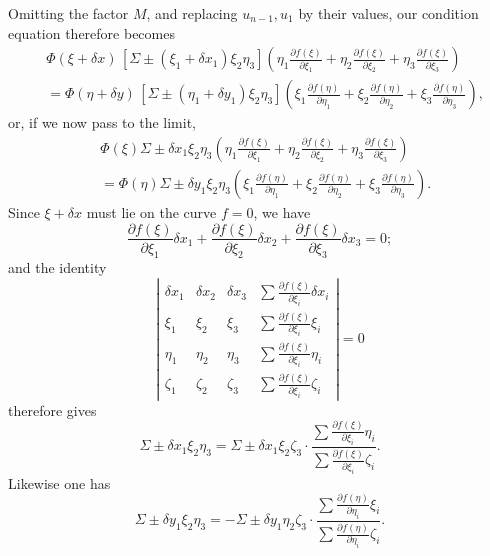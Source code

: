 \documentclass[10pt]{article}
\begin{document}
Omitting the factor \(M\), and replacing \(u_{n-1},u_1\) by their values, our condition equation therefore becomes
\[
\begin{aligned}
&\Phi(\xi+\delta x)\,[\Sigma\pm(\xi_1+\delta x_1)\xi_2\eta_3]
\left(\eta_1\frac{\partial f(\xi)}{\partial\xi_1}+\eta_2\frac{\partial f(\xi)}{\partial\xi_2}+\eta_3\frac{\partial f(\xi)}{\partial\xi_3}\right)\\
&=\Phi(\eta+\delta y)\,[\Sigma\pm(\eta_1+\delta y_1)\xi_2\eta_3]
\left(\xi_1\frac{\partial f(\eta)}{\partial\eta_1}+\xi_2\frac{\partial f(\eta)}{\partial\eta_2}+\xi_3\frac{\partial f(\eta)}{\partial\eta_3}\right),
\end{aligned}
\]
or, if we now pass to the limit,
\[
\begin{aligned}
&\Phi(\xi)\Sigma\pm\delta x_1\xi_2\eta_3
\left(\eta_1\frac{\partial f(\xi)}{\partial\xi_1}+\eta_2\frac{\partial f(\xi)}{\partial\xi_2}+\eta_3\frac{\partial f(\xi)}{\partial\xi_3}\right)\\
&=\Phi(\eta)\Sigma\pm\delta y_1\xi_2\eta_3
\left(\xi_1\frac{\partial f(\eta)}{\partial\eta_1}+\xi_2\frac{\partial f(\eta)}{\partial\eta_2}+\xi_3\frac{\partial f(\eta)}{\partial\eta_3}\right).
\end{aligned}
\]
Since \(\xi+\delta x\) must lie on the curve \(f=0\), we have
\[
\frac{\partial f(\xi)}{\partial\xi_1}\delta x_1
+\frac{\partial f(\xi)}{\partial\xi_2}\delta x_2
+\frac{\partial f(\xi)}{\partial\xi_3}\delta x_3=0;
\]
and the identity
\[
\left|
\begin{array}{cccc}
\delta x_1&\delta x_2&\delta x_3&\displaystyle\sum\frac{\partial f(\xi)}{\partial\xi_i}\delta x_i\\
\xi_1&\xi_2&\xi_3&\displaystyle\sum\frac{\partial f(\xi)}{\partial\xi_i}\xi_i\\
\eta_1&\eta_2&\eta_3&\displaystyle\sum\frac{\partial f(\xi)}{\partial\xi_i}\eta_i\\
\zeta_1&\zeta_2&\zeta_3&\displaystyle\sum\frac{\partial f(\xi)}{\partial\xi_i}\zeta_i
\end{array}
\right|=0
\]
therefore gives
\[
\Sigma\pm\delta x_1\xi_2\eta_3=
\Sigma\pm\delta x_1\xi_2\zeta_3\cdot
\frac{\displaystyle\sum\frac{\partial f(\xi)}{\partial\xi_i}\eta_i}
{\displaystyle\sum\frac{\partial f(\xi)}{\partial\xi_i}\zeta_i}.
\]
Likewise one has
\[
\Sigma\pm\delta y_1\xi_2\eta_3=
-\Sigma\pm\delta y_1\eta_2\zeta_3\cdot
\frac{\displaystyle\sum\frac{\partial f(\eta)}{\partial\eta_i}\xi_i}
{\displaystyle\sum\frac{\partial f(\eta)}{\partial\eta_i}\zeta_i}.
\]

\end{document}
